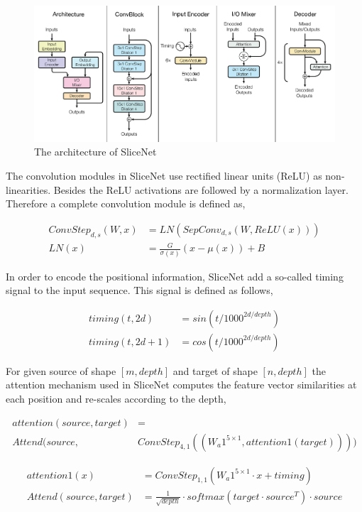 \documentclass[a4paper]{article}
\begin{document}
\begin{figure}
  \center
  \includegraphics[width=\textwidth]{img/SN}
  \caption{The architecture of SliceNet}
  \label{fig:sn}
\end{figure}


The convolution modules in SliceNet use rectified linear units (ReLU) as non-linearities. Besides the ReLU activations are followed by a normalization layer. Therefore a complete convolution module is defined as,


\begin{align*}
  ConvStep_{d,s}(W, x) &= LN(SepConv_{d,s}(W, ReLU(x))) \\
  LN(x) &= \frac{G}{\sigma(x)}(x - \mu(x)) + B
\end{align*}


In order to encode the  positional information, SliceNet  add a so-called timing
signal to the input sequence. This signal is defined as follows,


\begin{align*}
  timing(t, 2d) &= sin(t/1000^{2d/depth}) \\
  timing(t, 2d + 1) &= cos(t/1000^{2d/depth})
\end{align*}


For  given  source of shape $[m,  depth]$  and target  of shape $[n, depth]$ the
attention mechanism used in SliceNet computes the feature vector similarities at
each position and re-scales according to the depth,


\begin{align*}
  attention(source, target) &= \\
  Attend(source, &ConvStep_{4,1}((W_a1^{5 \times 1}, attention1(target))))
\end{align*}


\begin{align*}
  attention1(x) &= ConvStep_{1,1}(W_a1^{5 \times 1} \cdot x + timing) \\
  Attend(source, target) &= \frac{1}{\sqrt{depth}} \cdot
    softmax(target \cdot source^T) \cdot source
\end{align*}
\end{document}
